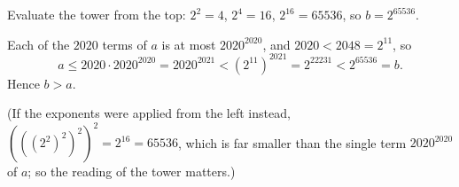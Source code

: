 Evaluate the tower from the top: $2^2=4$, $2^4=16$, $2^{16}=65536$, so $b=2^{65536}$.

Each of the $2020$ terms of $a$ is at most $2020^{2020}$, and $2020<2048=2^{11}$, so
\[a\le2020\cdot2020^{2020}=2020^{2021}<\left(2^{11}\right)^{2021}=2^{22231}<2^{65536}=b .\]
Hence $\boxed{b>a}$.

(If the exponents were applied from the left instead, $\left(\left(\left(2^2\right)^2\right)^2\right)^2=2^{16}=65536$, which is far smaller than the single term $2020^{2020}$ of $a$; so the reading of the tower matters.)
